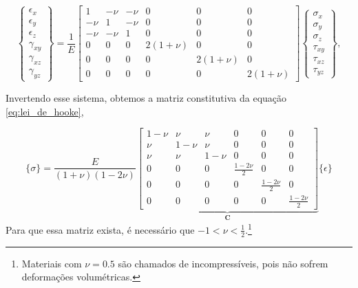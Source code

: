 \begin{equation}
    \begin{Bmatrix}
        \epsilon_x \\
        \epsilon_y \\
        \epsilon_z \\
        \gamma_{xy} \\
        \gamma_{xz} \\
        \gamma_{yz}
    \end{Bmatrix}
    =
    \frac{1}{E}
    \begin{bmatrix}
        1 & -\nu & -\nu & 0 & 0 & 0 \\
        -\nu & 1 & -\nu & 0 & 0 & 0 \\
        -\nu & -\nu & 1 & 0 & 0 & 0 \\
        0 & 0 & 0 & 2(1+\nu) & 0 & 0 \\
        0 & 0 & 0 & 0 & 2(1+\nu) & 0 \\
        0 & 0 & 0 & 0 & 0 & 2(1+\nu)
    \end{bmatrix}
    \begin{Bmatrix}
        \sigma_x \\
        \sigma_y \\
        \sigma_z \\
        \tau_{xy} \\
        \tau_{xz} \\
        \tau_{yz}
    \end{Bmatrix},
    \label{eq:lei_de_hooke_generalizada_matricial}
\end{equation}

Invertendo esse sistema, obtemos a matriz constitutiva da equação \ref{eq:lei_de_hooke},

\begin{equation}
    \{\sigma\} = \frac{E}{(1+\nu)(1-2\nu)}
    \underbrace{\begin{bmatrix} 1-\nu & \nu & \nu & 0 & 0 & 0 \\
        \nu & 1-\nu & \nu & 0 & 0 & 0 \\
        \nu & \nu & 1-\nu & 0 & 0 & 0 \\
        0 & 0 & 0 & \frac{1-2\nu}{2} & 0 & 0 \\
        0 & 0 & 0 & 0 & \frac{1-2\nu}{2} & 0 \\
        0 & 0 & 0 & 0 & 0 & \frac{1-2\nu}{2} 
    \end{bmatrix}}_{\bm{C}}
    \{\epsilon\}
\end{equation}
Para que essa matriz exista, é necessário que $-1 < \nu < \frac{1}{2}$.\footnote{Materiais com $\nu = 0.5$ são chamados de incompressíveis, pois não sofrem deformações volumétricas.}

